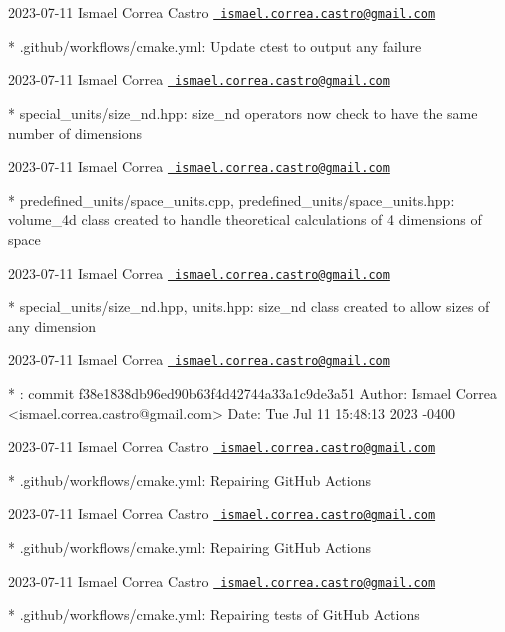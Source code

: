  2023-\/07-\/11 Ismael Correa Castro \href{mailto:ismael.correa.castro@gmail.com}{\texttt{ ismael.\+correa.\+castro@gmail.\+com}} \begin{DoxyVerb}* .github/workflows/cmake.yml: Update ctest to output any failure
\end{DoxyVerb}
 2023-\/07-\/11 Ismael Correa \href{mailto:ismael.correa.castro@gmail.com}{\texttt{ ismael.\+correa.\+castro@gmail.\+com}} \begin{DoxyVerb}* special_units/size_nd.hpp: size_nd operators now check to have the
same number of dimensions
\end{DoxyVerb}
 2023-\/07-\/11 Ismael Correa \href{mailto:ismael.correa.castro@gmail.com}{\texttt{ ismael.\+correa.\+castro@gmail.\+com}} \begin{DoxyVerb}* predefined_units/space_units.cpp,
predefined_units/space_units.hpp: volume_4d class created to handle
theoretical calculations of 4 dimensions of space
\end{DoxyVerb}
 2023-\/07-\/11 Ismael Correa \href{mailto:ismael.correa.castro@gmail.com}{\texttt{ ismael.\+correa.\+castro@gmail.\+com}} \begin{DoxyVerb}* special_units/size_nd.hpp, units.hpp: size_nd class created to
allow sizes of any dimension
\end{DoxyVerb}
 2023-\/07-\/11 Ismael Correa \href{mailto:ismael.correa.castro@gmail.com}{\texttt{ ismael.\+correa.\+castro@gmail.\+com}} \begin{DoxyVerb}* : commit f38e1838db96ed90b63f4d42744a33a1c9de3a51 Author: Ismael
Correa <ismael.correa.castro@gmail.com> Date:   Tue Jul 11 15:48:13
2023 -0400
\end{DoxyVerb}
 2023-\/07-\/11 Ismael Correa Castro \href{mailto:ismael.correa.castro@gmail.com}{\texttt{ ismael.\+correa.\+castro@gmail.\+com}} \begin{DoxyVerb}* .github/workflows/cmake.yml: Repairing GitHub Actions
\end{DoxyVerb}
 2023-\/07-\/11 Ismael Correa Castro \href{mailto:ismael.correa.castro@gmail.com}{\texttt{ ismael.\+correa.\+castro@gmail.\+com}} \begin{DoxyVerb}* .github/workflows/cmake.yml: Repairing GitHub Actions
\end{DoxyVerb}
 2023-\/07-\/11 Ismael Correa Castro \href{mailto:ismael.correa.castro@gmail.com}{\texttt{ ismael.\+correa.\+castro@gmail.\+com}} \begin{DoxyVerb}* .github/workflows/cmake.yml: Repairing tests of GitHub Actions
\end{DoxyVerb}
